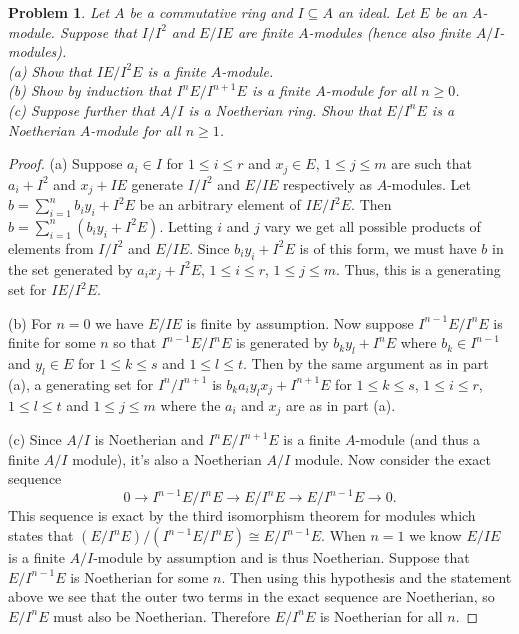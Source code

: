 \documentclass{article}
\newtheorem{problem}{Problem}
\begin{document}
\begin{problem}
Let $A$ be a commutative ring and $I \subseteq A$ an ideal. Let $E$ be an $A$-module. Suppose that $I/I^2$ and $E/IE$ are finite $A$-modules (hence also finite $A/I$-modules).\\
(a) Show that $IE/I^2E$ is a finite $A$-module.\\
(b) Show by induction that $I^nE/I^{n+1}E$ is a finite $A$-module for all $n \geq 0$.\\
(c) Suppose further that $A/I$ is a Noetherian ring. Show that $E/I^nE$ is a Noetherian $A$-module for all $n \geq 1$.
\end{problem}
\begin{proof}
(a) Suppose $a_i \in I$ for $1 \leq i \leq r$ and $x_j \in E$, $1 \leq j \leq m$ are such that $a_i + I^2$ and $x_j + IE$ generate $I/I^2$ and $E/IE$ respectively as $A$-modules. Let $b = \sum_{i=1}^n b_iy_i + I^2E$ be an arbitrary element of $IE/I^2E$. Then $b = \sum_{i=1}^n (b_iy_i + I^2E)$. Letting $i$ and $j$ vary we get all possible products of elements from $I/I^2$ and $E/IE$. Since $b_iy_i + I^2E$ is of this form, we must have $b$ in the set generated by $a_ix_j + I^2E$, $1 \leq i \leq r$, $1 \leq j \leq m$. Thus, this is a generating set for $IE/I^2E$.

(b) For $n = 0$ we have $E/IE$ is finite by assumption. Now suppose $I^{n-1}E/I^nE$ is finite for some $n$ so that $I^{n-1}E/I^nE$ is generated by $b_ky_l + I^nE$ where $b_k \in I^{n-1}$ and $y_l \in E$ for $1 \leq k \leq s$ and $1 \leq l \leq t$. Then by the same argument as in part (a), a generating set for $I^n/I^{n+1}$ is $b_ka_iy_lx_j + I^{n+1}E$ for $1 \leq k \leq s$, $1 \leq i \leq r$, $1 \leq l \leq t$ and $1 \leq j \leq m$ where the $a_i$ and $x_j$ are as in part (a).

(c) Since $A/I$ is Noetherian and $I^nE/I^{n+1}E$ is a finite $A$-module (and thus a finite $A/I$ module), it's also a Noetherian $A/I$ module. Now consider the exact sequence
\[
0 \to I^{n-1}E/I^nE \to E/I^nE \to E/I^{n-1}E \to 0.
\]
This sequence is exact by the third isomorphism theorem for modules which states that $(E/I^nE)/(I^{n-1}E/I^nE) \cong E/I^{n-1}E$. When $n = 1$ we know $E/IE$ is a finite $A/I$-module by assumption and is thus Noetherian. Suppose that $E/I^{n-1}E$ is Noetherian for some $n$. Then using this hypothesis and the statement above we see that the outer two terms in the exact sequence are Noetherian, so $E/I^nE$ must also be Noetherian. Therefore $E/I^nE$ is Noetherian for all $n$.
\end{proof}
\end{document}
